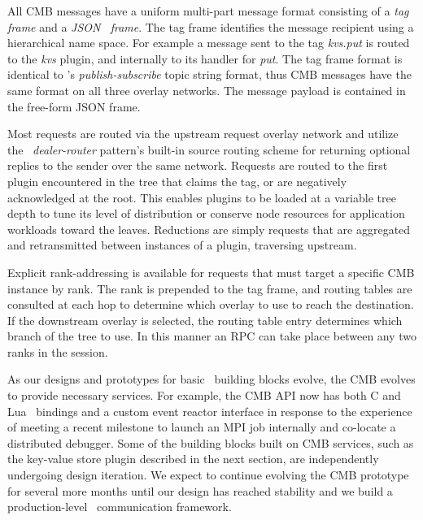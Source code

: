 All CMB messages have a uniform multi-part message format consisting of
a {\em tag frame} and a {\em JSON~\cite{rfc4627} frame}.  The tag frame identifies the
message recipient using a hierarchical name space.  For example a message
sent to the tag {\em kvs.put} is routed to the {\em kvs} plugin, and internally
to its handler for {\em put}.  The tag frame format is identical to
\zMQ's {\em publish-subscribe} topic string format, thus CMB messages
have the same format on all three overlay networks.
The message payload is contained in the free-form JSON frame.

Most requests are routed via the upstream request overlay network
and utilize the \zMQ\ {\em dealer-router} pattern's built-in source routing
scheme for returning optional replies to the sender over the same network.
Requests are routed to the first plugin encountered in the tree that claims
the tag, or are negatively acknowledged at the root.  This enables plugins
to be loaded at a variable tree depth to tune its level of distribution
or conserve node resources for application workloads toward the leaves.
Reductions are simply requests that are aggregated and retransmitted between
instances of a plugin, traversing upstream.

Explicit rank-addressing is available for requests that must target a
specific CMB instance by rank.  The rank is prepended to the tag frame,
and routing tables are consulted at each hop to determine which overlay
to use to reach the destination.  If the downstream overlay is selected,
the routing table entry determines which branch of the tree to use.
In this manner an RPC can take place between any two ranks in the session.

As our designs and prototypes for basic \flux\ building blocks evolve,
the CMB evolves to provide necessary services.  For example, the CMB API
now has both C and Lua~\cite{LuaBook}  bindings and a custom event reactor interface in
response to the experience of meeting a recent milestone to launch an
MPI job internally and co-locate a distributed debugger.  Some of the building
blocks built on CMB services, such as the key-value store plugin described
in the next section, are independently undergoing design iteration.
We expect to continue evolving the CMB prototype for several more months until
our design has reached stability and we build a production-level \flux\ 
communication framework.
